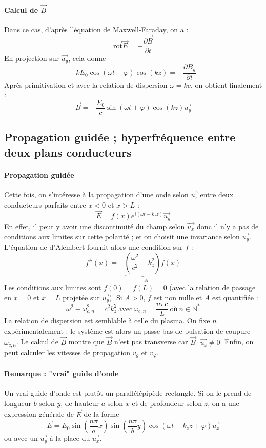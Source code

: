 \documentclass[french]{book}
\theoremstyle{plain}
\theoremstyle{definition}
\theoremstyle{remark}
\newcommand{\N}{\mathbb{N}}
\newcommand{\st}{^*}
\newcommand{\rot}{\overrightarrow{\text{rot}}}
\begin{document}
\paragraph{Calcul de $\overrightarrow{B}$} Dans ce cas, d'après l'équation de Maxwell-Faraday, on a : $$\rot\overrightarrow{E}=-\frac{\partial\overrightarrow{B}}{\partial t}$$ En projection sur $\overrightarrow{u_y}$, cela donne $$-kE_0\cos(\omega t+\varphi)\cos(kz)=-\frac{\partial B_y}{\partial t}$$ Après primitivation et avec la relation de dispersion $\omega=kc$, on obtient finalement : $$\overrightarrow{B}=-\frac{E_0}{c}\sin(\omega t+\varphi)\cos(kz)\overrightarrow{u_y}$$
\subsection{Propagation guidée ; hyperfréquence entre deux plans conducteurs}
\paragraph{Propagation guidée} Cette fois, on s'intéresse à la propagation d'une onde selon $\overrightarrow{u_z}$ entre deux conducteurs parfaits entre $x<0$ et $x>L$ : $$\overrightarrow{E}=f(x)e^{i(\omega t-k_z z)}\overrightarrow{u_y}$$ En effet, il peut y avoir une discontinuité du champ selon $\overrightarrow{u_x}$ donc il n'y a pas de conditions aux limites sur cette polarité ; et on choisit une invariance selon $\overrightarrow{u_y}$. L'équation de d'Alembert fournit alors une condition sur $f$ : $$f''(x)=-\underbrace{\left(\frac{\omega^2}{c^2}-k_z^2\right)}_{=A}f(x)$$ Les conditions aux limites sont $f(0)=f(L)=0$ (avec la relation de passage en $x=0$ et $x=L$ projetée sur $\overrightarrow{u_y}$). Si $A>0$, $f$ est non nulle et $A$ est quantifiée : $$\omega^2-\omega_{c,n}^2=c^2k_z^2 \ \text{avec} \ \omega_{c,n}=\frac{n\pi c}{L} \ \text{où} \ n\in\N\st$$ La relation de dispersion est semblable à celle du plasma. On fixe $n$ expérimentalement : le système est alors un passe-bas de pulsation de coupure $\omega_{c,n}$. Le calcul de $\overrightarrow{B}$ montre que $\overrightarrow{B}$ n'est pas transverse car $\overrightarrow{B}\cdot\overrightarrow{u_z}\ne0$. Enfin, on peut calculer les vitesses de propagation $v_g$ et $v_\varphi$.
\paragraph{Remarque : "vrai" guide d'onde} Un vrai guide d'onde est plutôt un parallélépipède rectangle. Si on le prend de longueur $b$ selon $y$, de hauteur $a$ selon $x$ et de profondeur selon $z$, on a une expression générale de $\overrightarrow{E}$ de la forme $$\overrightarrow{E}=E_0\sin\left(\frac{n\pi}{a}x\right)\sin\left(\frac{n\pi}{b}y\right)\cos\left(\omega t-k_zz+\varphi\right)\overrightarrow{u_x}$$ ou avec un $\overrightarrow{u_y}$ à la place du $\overrightarrow{u_x}$.
\end{document}
